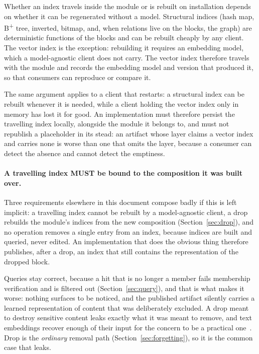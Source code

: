 \documentclass[11pt,a4paper]{article}
\begin{document}
Whether an index travels inside the module or is rebuilt on installation depends
on whether it can be regenerated without a model. Structural indices (hash map,
B\textsuperscript{+} tree, inverted, bitmap, and, when relations live on the
blocks, the graph) are deterministic functions of the blocks and can be rebuilt
cheaply by any client. The vector index is the exception: rebuilding it requires
an embedding model, which a model-agnostic client does not carry. The vector index therefore travels with the module and records the embedding
model and version that produced it, so that consumers can reproduce or compare
it.

The same argument applies to a client that restarts: a structural index can be
rebuilt whenever it is needed, while a client holding the vector index only in
memory has lost it for good. An implementation must therefore persist the
travelling index locally, alongside the module it belongs to, and must not
republish a placeholder in its stead: an artifact whose layer claims a vector
index and carries none is worse than one that omits the layer, because a consumer
can detect the absence and cannot detect the emptiness.

\paragraph{A travelling index MUST be bound to the composition it was built over.}
Three requirements elsewhere in this document compose badly if this is left
implicit: a travelling index cannot be rebuilt by a model-agnostic client, a
drop rebuilds the module's indices from the new composition
(Section~\ref{sec:drop}), and no operation removes a single entry from an
index, because indices are built and queried, never edited. An implementation
that does the obvious thing therefore publishes, after a drop, an index that
still contains the representation of the dropped block.

Queries stay correct, because a hit that is no longer a member fails
membership verification and is filtered out (Section~\ref{sec:query}), and
that is what makes it worse: nothing surfaces to be noticed, and the published
artifact silently carries a learned representation of content that was
deliberately excluded. A drop meant to destroy sensitive content leaks exactly what it was meant to
remove, and text embeddings recover enough of their input for the concern to
be a practical one~\cite{morris2023embeddings}. Drop
is the \emph{ordinary} removal path (Section~\ref{sec:forgetting}), so it is
the common case that leaks.
\end{document}
